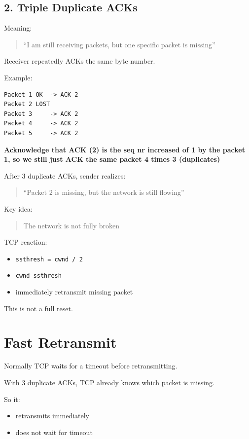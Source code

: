 \subsection{2. Triple Duplicate ACKs}

Meaning:

\begin{quote}
“I am still receiving packets, but one specific packet is missing”
\end{quote}

Receiver repeatedly ACKs the same byte number.

Example:

\begin{verbatim}
Packet 1 OK  -> ACK 2
Packet 2 LOST
Packet 3     -> ACK 2
Packet 4     -> ACK 2
Packet 5     -> ACK 2
\end{verbatim}
\textbf{Acknowledge that ACK (2) is the seq nr increased of 1 by the packet 1, so we still just ACK the same packet 4 times 3 (duplicates)}

After 3 duplicate ACKs, sender realizes:

\begin{quote}
“Packet 2 is missing, but the network is still flowing”
\end{quote}

Key idea:
\begin{quote}
The network is not fully broken
\end{quote}

TCP reaction:
\begin{itemize}
    \item \texttt{ssthresh = cwnd / 2}
    \item \texttt{cwnd \approx ssthresh}
    \item immediately retransmit missing packet
\end{itemize}

This is not a full reset.

\section{Fast Retransmit}

Normally TCP waits for a timeout before retransmitting.

With 3 duplicate ACKs, TCP already knows which packet is missing.

So it:
\begin{itemize}
    \item retransmits immediately
    \item does not wait for timeout
\end{itemize}

